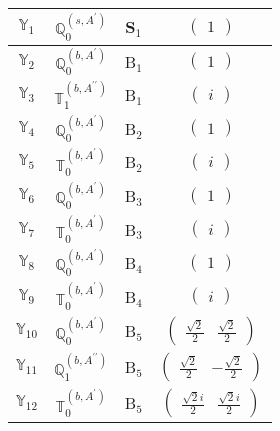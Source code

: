 \documentclass[fleqn,10pt,landscape]{article}
\begin{document}
\begin{itemize}
\begin{center}
\begin{longtable}{c|c|c|c}
$ \mathbb{Y}_{1} $ & $\mathbb{Q}_{0}^{(s,A^{\prime})}$ & S$_{1}$ & $\begin{pmatrix} 1 \end{pmatrix}$ \\ \hline
$ \mathbb{Y}_{2} $ & $\mathbb{Q}_{0}^{(b,A^{\prime})}$ & B$_{1}$ & $\begin{pmatrix} 1 \end{pmatrix}$ \\
$ \mathbb{Y}_{3} $ & $\mathbb{T}_{1}^{(b,A^{\prime\prime})}$ & B$_{1}$ & $\begin{pmatrix} i \end{pmatrix}$ \\ \hline
$ \mathbb{Y}_{4} $ & $\mathbb{Q}_{0}^{(b,A^{\prime})}$ & B$_{2}$ & $\begin{pmatrix} 1 \end{pmatrix}$ \\
$ \mathbb{Y}_{5} $ & $\mathbb{T}_{0}^{(b,A^{\prime})}$ & B$_{2}$ & $\begin{pmatrix} i \end{pmatrix}$ \\ \hline
$ \mathbb{Y}_{6} $ & $\mathbb{Q}_{0}^{(b,A^{\prime})}$ & B$_{3}$ & $\begin{pmatrix} 1 \end{pmatrix}$ \\
$ \mathbb{Y}_{7} $ & $\mathbb{T}_{0}^{(b,A^{\prime})}$ & B$_{3}$ & $\begin{pmatrix} i \end{pmatrix}$ \\ \hline
$ \mathbb{Y}_{8} $ & $\mathbb{Q}_{0}^{(b,A^{\prime})}$ & B$_{4}$ & $\begin{pmatrix} 1 \end{pmatrix}$ \\
$ \mathbb{Y}_{9} $ & $\mathbb{T}_{0}^{(b,A^{\prime})}$ & B$_{4}$ & $\begin{pmatrix} i \end{pmatrix}$ \\ \hline
$ \mathbb{Y}_{10} $ & $\mathbb{Q}_{0}^{(b,A^{\prime})}$ & B$_{5}$ & $\begin{pmatrix} \frac{\sqrt{2}}{2} & \frac{\sqrt{2}}{2} \end{pmatrix}$ \\
$ \mathbb{Y}_{11} $ & $\mathbb{Q}_{1}^{(b,A^{\prime\prime})}$ & B$_{5}$ & $\begin{pmatrix} \frac{\sqrt{2}}{2} & - \frac{\sqrt{2}}{2} \end{pmatrix}$ \\
$ \mathbb{Y}_{12} $ & $\mathbb{T}_{0}^{(b,A^{\prime})}$ & B$_{5}$ & $\begin{pmatrix} \frac{\sqrt{2} i}{2} & \frac{\sqrt{2} i}{2} \end{pmatrix}$ \\

\end{longtable}
\end{center}
\end{itemize}
\end{document}
